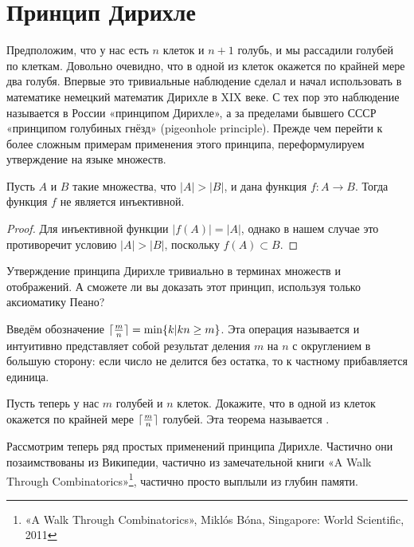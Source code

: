 \section{Принцип Дирихле}

Предположим, что у нас есть $n$ клеток и $n+1$ голубь, и мы рассадили голубей по клеткам. Довольно очевидно, что в одной из клеток окажется по крайней мере два голубя. Впервые это тривиальные наблюдение сделал и начал использовать в математике немецкий математик Дирихле в XIX веке. С тех пор это наблюдение называется в России «принципом Дирихле», а за пределами бывшего СССР «принципом голубиных гнёзд» (pigeonhole principle). Прежде чем перейти к более сложным примерам применения этого принципа, переформулируем утверждение на языке множеств.

\begin{thm}
Пусть $A$ и $B$ такие множества, что $|A|>|B|$, и дана функция $f:A\to B$. Тогда функция $f$ не является инъективной.
\end{thm}
\begin{proof}
Для инъективной функции $|f(A)| = |A|$, однако в нашем случае это противоречит условию $|A|>|B|$, поскольку $f(A)\subset B$.
\end{proof}

\begin{exercise}
Утверждение принципа Дирихле тривиально в терминах множеств и отображений. А сможете ли вы доказать этот принцип, используя только аксиоматику Пеано?
\end{exercise}

Введём обозначение $\lceil {m\over n} \rceil = \min\{k|kn\ge m\}$. Эта операция называется  и интуитивно представляет собой результат деления $m$ на $n$ с округлением в большую сторону: если число не делится без остатка, то к частному прибавляется единица.

\begin{exercise}
Пусть теперь у нас $m$ голубей и $n$ клеток. Докажите, что в одной из клеток окажется по крайней мере $\lceil{m\over n}\rceil$ голубей. Эта теорема называется .
\end{exercise}

Рассмотрим теперь ряд простых применений принципа Дирихле. Частично они позаимствованы из Википедии, частично из замечательной книги «A Walk Through Combinatorics»\footnote{«A Walk Through Combinatorics», Miklós Bóna, Singapore: World Scientific, 2011}, частично просто выплыли из глубин памяти.

